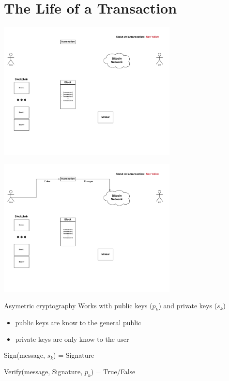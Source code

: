 \documentclass{beamer}
\begin{document}
\section{The Life of a Transaction}

\begin{frame}
    \begin{center}
        \includegraphics[height=7cm]{images/explanation-0.png}
    \end{center}
\end{frame}

\begin{frame}
    \begin{center}
        \includegraphics[height=7cm]{images/explanation-2.png}
    \end{center}
\end{frame}

\begin{frame}
    \begin{block}{Asymetric cryptography}
        Works with public keys ($p_k$) and private keys ($s_k$)
        \pause
        \begin{itemize}
            \item public keys are know to the general public
            \item private keys are only know to the user
                \pause
        \end{itemize}
        Sign(message, $s_k$) = Signature

        \pause
        Verify(message, Signature, $p_k$) = True/False
    \end{block}
\end{frame}
\end{document}
